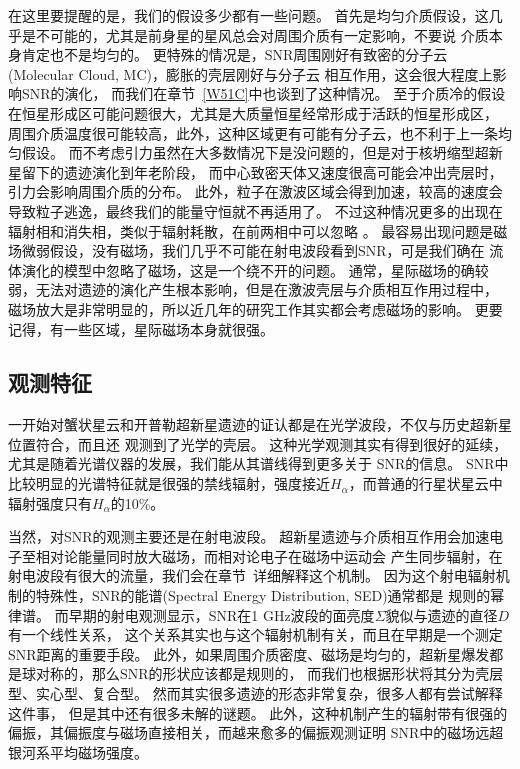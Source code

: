 在这里要提醒的是，我们的假设多少都有一些问题。
首先是均匀介质假设，这几乎是不可能的，尤其是前身星的星风总会对周围介质有一定影响，不要说
介质本身肯定也不是均匀的。
更特殊的情况是，SNR周围刚好有致密的分子云(Molecular Cloud, MC)，膨胀的壳层刚好与分子云
相互作用，这会很大程度上影响SNR的演化\citep{1972PhDT........47S, Orlando2008, Zhang2017}，
而我们在章节~\ref{W51C}中也谈到了这种情况。
至于介质冷的假设在恒星形成区可能问题很大，尤其是大质量恒星经常形成于活跃的恒星形成区，
周围介质温度很可能较高，此外，这种区域更有可能有分子云，也不利于上一条均匀假设。
而不考虑引力虽然在大多数情况下是没问题的，但是对于核坍缩型超新星留下的遗迹演化到年老阶段，
而中心致密天体又速度很高可能会冲出壳层时，引力会影响周围介质的分布。
此外，粒子在激波区域会得到加速，较高的速度会导致粒子逃逸，最终我们的能量守恒就不再适用了。
不过这种情况更多的出现在辐射相和消失相，类似于辐射耗散，在前两相中可以忽略
\citep{1967IAUS...31..117K}。
最容易出现问题是磁场微弱假设，没有磁场，我们几乎不可能在射电波段看到SNR，可是我们确在
流体演化的模型中忽略了磁场，这是一个绕不开的问题。
通常，星际磁场的确较弱，无法对遗迹的演化产生根本影响，但是在激波壳层与介质相互作用过程中，
磁场放大是非常明显的，所以近几年的研究工作其实都会考虑磁场的影响。
更要记得，有一些区域，星际磁场本身就很强。

\subsection{观测特征}
一开始对蟹状星云和开普勒超新星遗迹的证认都是在光学波段，不仅与历史超新星位置符合，而且还
观测到了光学的壳层。
这种光学观测其实有得到很好的延续，尤其是随着光谱仪器的发展，我们能从其谱线得到更多关于
SNR的信息。
SNR中比较明显的光谱特征就是很强的禁线辐射，强度接近$H_\alpha$，而普通的行星状星云中
辐射强度只有$H_\alpha$的10\%。

当然，对SNR的观测主要还是在射电波段。
超新星遗迹与介质相互作用会加速电子至相对论能量同时放大磁场，而相对论电子在磁场中运动会
产生同步辐射，在射电波段有很大的流量，我们会在章节~\label{TheoryDSACR}详细解释这个机制。
因为这个射电辐射机制的特殊性，SNR的能谱(Spectral Energy Distribution, SED)通常都是
规则的幂律谱。
而早期的射电观测显示，SNR在1 GHz波段的面亮度$\Sigma$貌似与遗迹的直径$D$有一个线性关系，
这个关系其实也与这个辐射机制有关，而且在早期是一个测定SNR距离的重要手段。
此外，如果周围介质密度、磁场是均匀的，超新星爆发都是球对称的，那么SNR的形状应该都是规则的，
而我们也根据形状将其分为壳层型、实心型、复合型。
然而其实很多遗迹的形态非常复杂\citep{West2016}，很多人都有尝试解释这件事\citet{Zhang2018}，
但是其中还有很多未解的谜题。
此外，这种机制产生的辐射带有很强的偏振，其偏振度与磁场直接相关，而越来愈多的偏振观测证明
SNR中的磁场远超银河系平均磁场强度。

